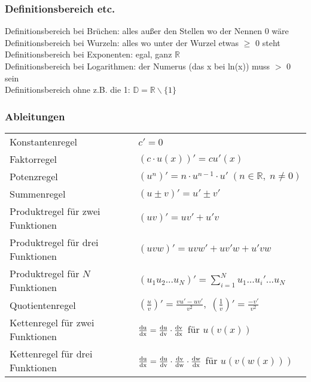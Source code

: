 \documentclass[6pt,a4paper]{scrartcl}
\begin{document}
\begin{multicols*}{2}
\subsubsection{Definitionsbereich etc.}
Definitionsbereich bei Brüchen: alles außer den Stellen wo der Nennen 0 wäre \\
Definitionsbereich bei Wurzeln: alles wo unter der Wurzel etwas $\geq$ 0 steht \\
Definitionsbereich bei Exponenten: egal, ganz $\mathbb{R}$ \\
Definitionsbereich bei Logarithmen: der Numerus (das x bei ln(x)) muss $>$ 0 sein \\
Definitionsbereich ohne z.B. die 1: $\mathbb{D} = \mathbb{R} \backslash \{1\}$ \\

\subsubsection{Ableitungen}
\begin{tabular}{ll}
Konstantenregel						& $ c'=0 $																								\\
Faktorregel							& $ (c \cdot u(x))' = c u'(x) $																			\\
Potenzregel							& $ \left(u^n\right)' = n \cdot u^{n-1} \cdot u'\; (n \in \mathbb R, \; n \neq 0) $						\\
Summenregel							& $ (u\pm v)' = u'\pm v' $																				\\
Produktregel für zwei Funktionen		& $ (uv)' = uv'+u'v $																					\\
Produktregel für drei Funktionen		& $ (uvw)' = uvw' + uv'w + u'vw $																		\\
Produktregel für $ N $ Funktionen	& $ (u_1u_2...u_N)' = \sum_{i=1}^Nu_1...u_i'...u_N $														\\
Quotientenregel						& $ \left(\frac{u}{v}\right)' = \frac{vu'-uv'}{v^2}, \; \left( \frac{1}{v}\right)' = \frac{-v'}{v^2} $		\\
Kettenregel für zwei Funktionen		& $ \frac{\rm d u}{\rm d x} = \frac{\rm d u}{\rm d v}\cdot \frac{\rm d v}{\rm d x} $ für $ u(v(x)) $		\\
Kettenregel für drei Funktionen		& $ \frac{\rm d u }{\rm d x} = \frac{\rm d u}{\rm d v}\cdot \frac{\rm d v}{\rm d w}\cdot \frac{\rm d w}{\rm d x} $ für $ u(v(w(x))) $ \\
\end{tabular}\\
\\

\end{multicols*}
\end{document}

